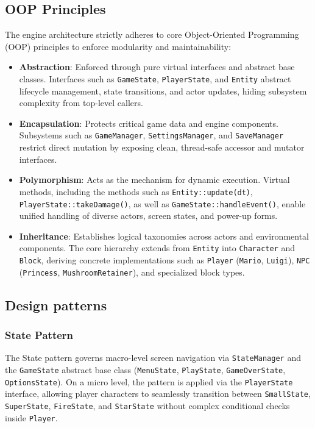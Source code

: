 \documentclass[12pt, a4paper]{article}
\begin{document}
\subsection{OOP Principles}
The engine architecture strictly adheres to core Object-Oriented Programming (OOP) principles to enforce modularity and maintainability:
\begin{itemize}
\item \textbf{Abstraction}: Enforced through pure virtual interfaces and abstract base classes. Interfaces such as \texttt{GameState}, \texttt{PlayerState}, and \texttt{Entity} abstract lifecycle management, state transitions, and actor updates, hiding subsystem complexity from top-level callers.
\item \textbf{Encapsulation}: Protects critical game data and engine components. Subsystems such as \texttt{GameManager}, \texttt{SettingsManager}, and \texttt{SaveManager} restrict direct mutation by exposing clean, thread-safe accessor and mutator interfaces.
\item \textbf{Polymorphism}: Acts as the mechanism for dynamic execution. Virtual methods, including the methods such as \texttt{Entity::update(dt)}, \texttt{PlayerState::takeDamage()}, as well as \texttt{GameState::handleEvent()}, enable unified handling of diverse actors, screen states, and power-up forms.
\item \textbf{Inheritance}: Establishes logical taxonomies across actors and environmental components. The core hierarchy extends from \texttt{Entity} into \texttt{Character} and \texttt{Block}, deriving concrete implementations such as \texttt{Player} (\texttt{Mario}, \texttt{Luigi}), \texttt{NPC} (\texttt{Princess}, \texttt{MushroomRetainer}), and specialized block types.
\end{itemize}

\subsection{Design patterns}

\subsubsection{State Pattern}
The State pattern governs macro-level screen navigation via \texttt{StateManager} and the \texttt{GameState} abstract base class (\texttt{MenuState}, \texttt{PlayState}, \texttt{GameOverState}, \texttt{OptionsState}). On a micro level, the pattern is applied via the \texttt{PlayerState} interface, allowing player characters to seamlessly transition between \texttt{SmallState}, \texttt{SuperState}, \texttt{FireState}, and \texttt{StarState} without complex conditional checks inside \texttt{Player}.
\end{document}
